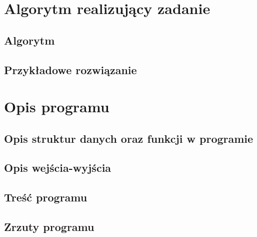 \documentclass[11pt]{article} %
\begin{document}
\section{Algorytm realizujący zadanie}
\subsection{Algorytm}
\subsection{Przykładowe rozwiązanie}
\section{Opis programu}
\subsection{Opis struktur danych oraz funkcji w programie}
\subsection{Opis wejścia-wyjścia}
\subsection{Treść programu}
\subsection{Zrzuty programu}
\end{document}
